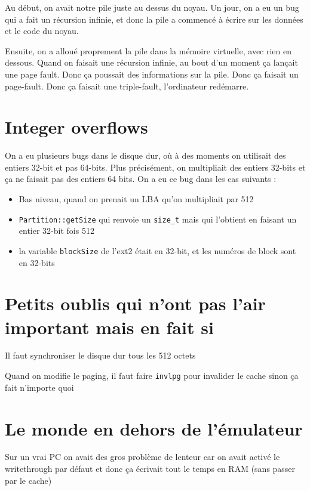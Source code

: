 \documentclass[12pt]{report}
\begin{document}
Au début, on avait notre pile juste au dessus du noyau. Un jour, on a eu un bug qui a fait un récursion infinie, et donc la pile a commencé à écrire sur les données et le code du noyau.

Ensuite, on a alloué proprement la pile dans la mémoire virtuelle, avec rien en dessous. Quand on faisait une récursion infinie, au bout d'un moment ça lançait une page fault. Donc ça poussait des informations sur la pile. Donc ça faisait un page-fault. Donc ça faisait une triple-fault, l'ordinateur redémarre.

\section*{Integer overflows}

On a eu plusieurs bugs dans le disque dur, où à des moments on utilisait des entiers 32-bit et pas 64-bits.
Plus précisément, on multipliait des entiers 32-bits et ça ne faisait pas des entiers 64 bits.
On a eu ce bug dans les cas suivants :

\begin{itemize}
    \item Bas niveau, quand on prenait un LBA qu'on multipliait par 512
    \item \verb$Partition::getSize$ qui renvoie un \verb$size_t$ mais qui l'obtient en faisant un entier 32-bit fois 512
    \item la variable \verb$blockSize$ de l'ext2 était en 32-bit, et les numéros de block sont en 32-bits
\end{itemize}

\section*{Petits oublis qui n'ont pas l'air important mais en fait si}

Il faut synchroniser le disque dur tous les 512 octets

Quand on modifie le paging, il faut faire \verb$invlpg$ pour invalider le cache sinon ça fait n'importe quoi

\section*{Le monde en dehors de l'émulateur}

Sur un vrai PC on avait des gros problème de lenteur car on avait activé le writethrough par défaut et donc ça écrivait tout le temps en RAM (sans passer par le cache)
\end{document}
